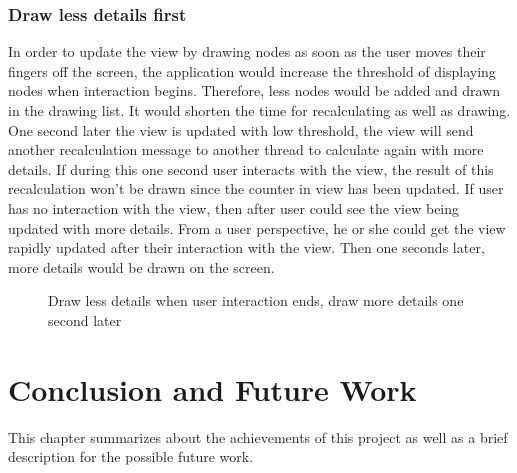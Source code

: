 \documentclass[a4paper,11pt,twoside]{report}
\begin{document}
\subsection{Draw less details first}

In order to update the view by drawing nodes as soon as the user moves their fingers off the screen, the application would increase the threshold of displaying nodes when interaction begins. Therefore, less nodes would be added and drawn in the drawing list. It would shorten the time for recalculating as well as drawing. One second later the view is updated with low threshold, the view will send another recalculation message to another thread to calculate again with more details. If during this one second user interacts with the view, the result of this recalculation won't be drawn since the counter in view has been updated. If user has no interaction with the view, then after user could see the view being updated with more details. From a user perspective, he or she could get the view rapidly updated after their interaction with the view. Then one seconds later, more details would be drawn on the screen.

\begin{figure}[H]
\caption{Draw less details when user interaction ends, draw more details one second later}
\end{figure}

\chapter{Conclusion and Future Work}

This chapter summarizes about the achievements of this project as well as a brief description for the possible future work.
\end{document}
